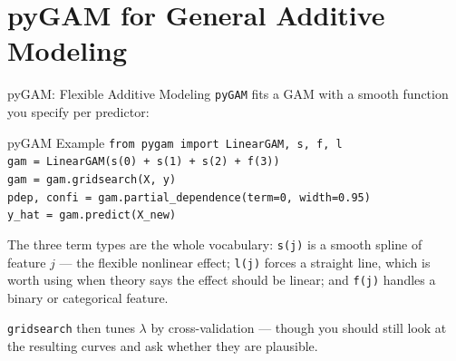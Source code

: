 \documentclass[aspectratio=169, 11pt]{beamer}
\begin{document}
\section{pyGAM for General Additive Modeling}


\begin{frame}{pyGAM: Flexible Additive Modeling}
  \texttt{pyGAM} fits a GAM with a smooth function you specify per predictor:
  \begin{examplebox}{pyGAM Example}
    {\footnotesize
    \texttt{from pygam import LinearGAM, s, f, l}\\[2pt]
    \texttt{gam = LinearGAM(s(0) + s(1) + s(2) + f(3))}\\
    \texttt{gam = gam.gridsearch(X, y)}\\[2pt]
    \texttt{pdep, confi = gam.partial\_dependence(term=0, width=0.95)}\\
    \texttt{y\_hat = gam.predict(X\_new)}
    }
  \end{examplebox}
  The three term types are the whole vocabulary: \texttt{s(j)} is a smooth spline of
  feature $j$ --- the flexible nonlinear effect; \texttt{l(j)} forces a straight line, which
  is worth using when theory says the effect should be linear; and \texttt{f(j)} handles a
  binary or categorical feature.

  \vspace{0.15cm}
  \texttt{gridsearch} then tunes $\lambda$ by cross-validation --- though you should still
  look at the resulting curves and ask whether they are plausible.
\end{frame}
\end{document}
